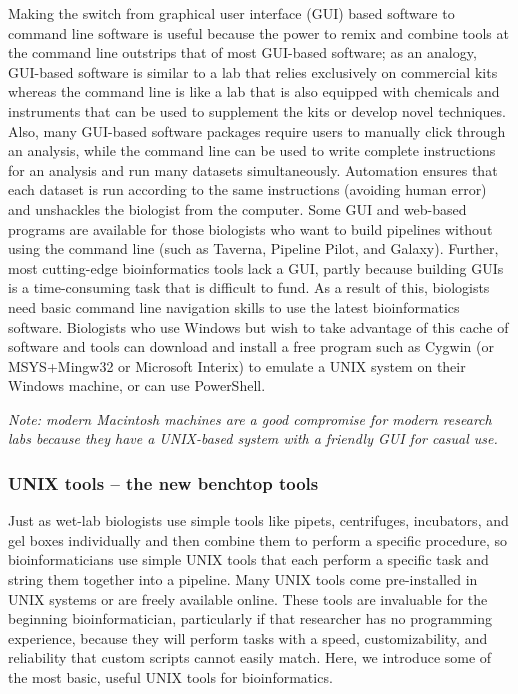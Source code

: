 \documentclass[ChapterTOCs,krantz2]{krantz} %
\begin{document}
Making the switch from graphical user interface (GUI) based software 
to command line software is useful because
the power to remix and combine tools at the command line outstrips that
of most GUI-based software; as an analogy, GUI-based software is similar to a lab
that relies exclusively on commercial kits whereas the command line 
is like a lab that is also equipped with chemicals and instruments that can be used 
to supplement the kits or develop novel techniques.  Also, many
GUI-based software packages require users to manually click through an analysis,
while the command line can be used to write complete instructions for an
analysis and run many datasets simultaneously.   Automation ensures 
that each dataset is run according to the
same instructions (avoiding human error) and unshackles the biologist from
the computer.  
Some GUI and web-based programs are available 
for those biologists who want to build pipelines without using 
the command line (such as Taverna, Pipeline Pilot, and Galaxy).  
Further, most
cutting-edge bioinformatics tools lack a GUI,
partly because building GUIs is a time-consuming task that is
difficult to fund.  As a result of this, biologists need
basic command line navigation skills to use the latest bioinformatics software.  Biologists
who use Windows but wish to take advantage of this cache of software and tools
can download and install a free program such as Cygwin (or MSYS+Mingw32 or 
Microsoft Interix) to emulate a UNIX system
on their Windows machine, or can use PowerShell.

\textsl{Note: modern Macintosh machines are a
good compromise for modern research labs because they 
have a UNIX-based system with a friendly GUI for casual use.}

\subsubsection{UNIX tools -- the new benchtop tools}

Just as wet-lab biologists use simple tools like pipets, centrifuges,
incubators, and gel boxes individually and then combine them to perform a
specific procedure, so bioinformaticians use simple UNIX tools
that each perform a specific task and string them together into a pipeline.
Many UNIX tools come pre-installed in UNIX systems or are freely
available online. These tools are invaluable for the beginning
bioinformatician, particularly if that researcher has no programming experience, 
because they will perform tasks with a speed, customizability, and
reliability that custom scripts cannot easily match.  Here, we
introduce some of the most basic, useful UNIX tools for bioinformatics.
\end{document}
